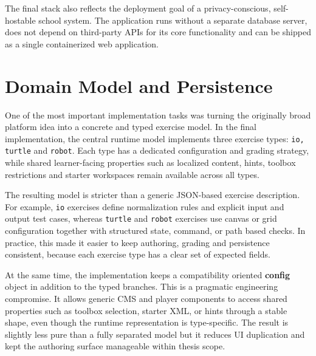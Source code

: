 The final stack also reflects the deployment goal of a privacy-conscious, self-hostable school system.
The application runs without a separate database server, does not depend on third-party APIs for its core
functionality and can be shipped as a single containerized web application.

\section{Domain Model and Persistence}
\label{sec:domain-model}
One of the most important implementation tasks was turning the originally broad platform idea into a
concrete and typed exercise model. In the final implementation, the central runtime model implements
three exercise types: \texttt{io, turtle} and \texttt{robot}.
Each type has a dedicated configuration and grading strategy, while shared
learner-facing properties such as localized content, hints, toolbox restrictions and
starter workspaces remain available across all types.

The resulting model is stricter than a generic JSON-based exercise description.
For example, \texttt{io} exercises define normalization rules and explicit input and
output test cases, whereas \texttt{turtle} and \texttt{robot} exercises use canvas or
grid configuration together with structured state, command, or path based checks.
In practice, this made it easier to keep authoring, grading and persistence consistent,
because each exercise type has a clear set of expected fields.

At the same time, the implementation keeps a compatibility oriented \textbf{config}
object in addition to the typed branches. This is a pragmatic engineering compromise.
It allows generic CMS and player components to access shared properties such as toolbox selection,
starter XML, or hints through a stable shape, even though the runtime representation is type-specific.
The result is slightly less pure than a fully separated model but it reduces UI duplication and
kept the authoring surface manageable within thesis scope.


